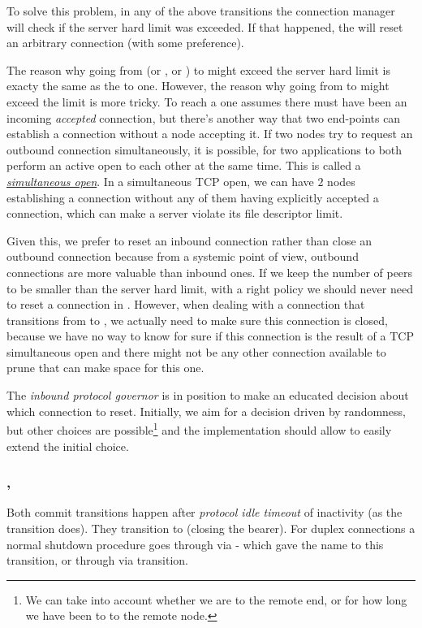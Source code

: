 To solve this problem, in any of the above transitions the connection manager will check
if the server hard limit was exceeded. If that happened, the \connmngr{} will reset an
arbitrary connection (with some preference).

The reason why going from \OutboundStateDupTau{} (or \OutboundStateDup{}, or
\OutboundIdleStateDup{}) to \InboundStateDup{} might exceed the server hard limit
is exacty the same as the \DuplexState{} to \InboundStateDup{} one.
However, the reason why going from \OutboundStateDupTau{} to \DuplexState{} might
exceed the limit is more tricky.  To reach a \DuplexState{} one assumes there must
have been an incoming \textit{accepted} connection, but there's another way that two
end-points can establish a connection without a node accepting it. If two nodes try
to request an outbound connection simultaneously, it is possible, for two applications
to both perform an active open to each other at the same time.  This is called a
\href{https://flylib.com/books/en/3.223.1.190/1/}{\textit{simultaneous open}}.
In a simultaneous TCP open, we can have $2$ nodes establishing a connection without any of
them having explicitly accepted a connection, which can make a server violate its file
descriptor limit.

Given this, we prefer to reset an inbound connection rather than close an outbound
connection because from a systemic point of view, outbound connections are more
valuable than inbound ones. If we keep the number of \established{} peers to
be smaller than the server hard limit, with a right policy we should never need
to reset a connection in \DuplexState{}. However, when dealing with a connection that
transitions from \OutboundStateDupTau{} to \DuplexState{}, we actually need to
make sure this connection is closed, because we have no way to know for sure
if this connection is the result of a TCP simultaneous open and there might
not be any other connection available to prune that can make space for this one.

The \textit{inbound protocol governor} is in position to make an educated
decision about which connection to reset. Initially, we aim for a decision driven by
randomness, but other choices are possible\footnote{We can take into account
whether we are \hot{} to the remote end, or for how long we have been \hot{} to
to the remote node.} and the implementation should allow to easily extend the
initial choice.


\subsubsection{\CommitUniRem{}, \CommitDupRem{}}\label{sec:tr_commit_rem}
Both commit transitions happen after \textit{protocol idle timeout} of
inactivity (as the \TimeoutExpired{} transition does). They transition to
\TerminatingState{} (closing the bearer). For duplex connections a normal
shutdown procedure goes through \InboundIdleStateDup{}
via \CommitDupRem{} - which gave the name to this transition, or through
\OutboundIdleStateDup{} via \CommitDupLoc{} transition.

